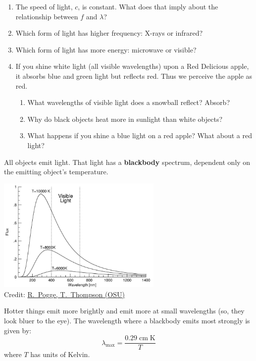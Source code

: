 \documentclass[11pt]{article}%
\newcommand{\SPACE}{\vspace{3em}}
\newcommand*{\unit}[1]{\;\mathrm{#1}}  %
\begin{document}
\begin{enumerate}
    \item The speed of light, $c$, is constant. What does that imply about the
    relationship between $f$ and $\lambda$?\SPACE
    \item Which form of light has higher frequency: X-rays or infrared?\SPACE
    \item Which form of light has more energy: microwave or visible?\SPACE
    \item If you shine white light (all visible wavelengths) upon a Red Delicious
    apple, it absorbs blue and green light but reflects red. Thus we perceive the
    apple as red.
    \begin{enumerate}
        \item What wavelengths of visible light does a snowball reflect? Absorb?\SPACE
        \item Why do black objects heat more in sunlight than white objects?\SPACE
        \item What happens if you shine a blue light on a red apple? What about a red light?\SPACE
    \end{enumerate}
\end{enumerate}

All objects emit light.  That light has a \textbf{blackbody} spectrum,
dependent only on the emitting object's temperature.
\begin{center}
    \includegraphics[width=0.6\textwidth]{bb3T.jpg} \\
    \small{Credit: \href{http://www.astronomy.ohio-state.edu/~thompson/161/spectra.html}{R.~Pogge, T.~Thompson (OSU)}}
\end{center}
Hotter things emit more brightly and emit more at small wavelengths (so, they
look bluer to the eye).
The wavelength where a blackbody emits most strongly is given by:
\[
    \lambda_\mathrm{max} = \frac{0.29 \unit{cm\;K}}{T}
\]
where $T$ has units of Kelvin.
\end{document}
